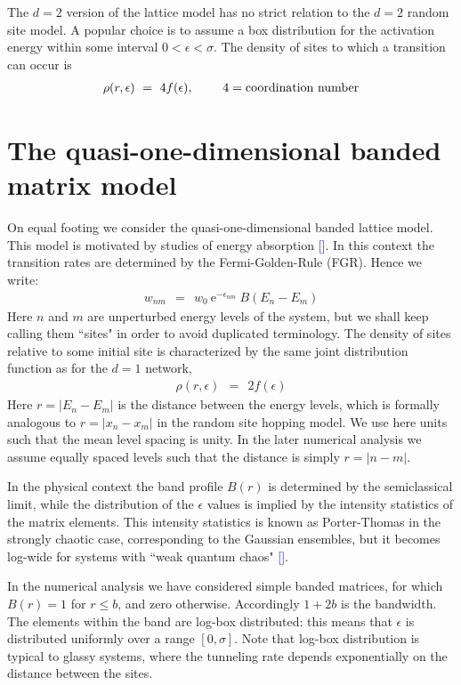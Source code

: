 \documentclass[aps,prb,floats,floatfix,twocolumn]{revtex4}
\newcommand{\eexp}{\mbox{e}^}
\newcommand{\mylabel}[1]{\label{#1}}
\newcommand{\beq}{\begin{eqnarray}}
\newcommand{\eeq}{\end{eqnarray}}
\newcommand{\be}[1]{\begin{eqnarray}\ifthenelse{#1=-1}
{\nonumber}{\ifthenelse{#1=0}{}{\mylabel{e#1}}}}
\renewcommand{\cite}[1]{\textcolor{blue}{[\onlinecite{#1}}]} %
\begin{document}
 
The $d{=}2$ version of the lattice model has no 
strict relation to the $d{=}2$ random site model. 
A popular choice is to assume a box distribution
for the activation energy within 
some interval ${0<\epsilon<\sigma}$. 
The density of sites to which a transition can occur is
%
\be{17}
\rho(r,\epsilon) \ = \ 4f(\epsilon), 
\ \ \ \ \ \ \ 4=\text{coordination number} 
\eeq 



\section{The quasi-one-dimensional banded matrix model}

\label{aBanded}

On equal footing we consider the quasi-one-dimensional banded lattice model.
This model is motivated by studies of energy absorption \cite{slk}.
In this context the transition rates are determined 
by the Fermi-Golden-Rule (FGR). Hence we write:
%
\beq
w_{nm} \ \ = \ \ w_0 \ \eexp{-\epsilon_{nm}} \ B\left(E_n-E_m\right)
\eeq
% 
Here $n$ and $m$ are unperturbed energy levels of the system, 
but we shall keep calling them ``sites" in order to avoid 
duplicated terminology.
The density of sites relative to some initial site 
is characterized by the same joint distribution function
as for the $d{=}1$ network,  
%
\beq
\rho(r,\epsilon) \ \ = \ \ 2f(\epsilon) 
\eeq 
%
Here $r=|E_n-E_m|$ is the distance between the energy levels, 
which is formally analogous to $r=|x_n-x_m|$ in the random site hopping model.
We use here units such that the mean level spacing is unity.
In the later numerical analysis we assume equally spaced levels 
such that the distance is simply ${r=|n-m|}$. 

In the physical context the band profile $B(r)$ is determined 
by the semiclassical limit, while the distribution of the $\epsilon$ 
values is implied by the intensity statistics of the matrix elements.
This intensity statistics is known as Porter-Thomas in the strongly 
chaotic case, corresponding to the Gaussian ensembles, 
but it becomes log-wide for systems with ``weak quantum chaos" \cite{SparseMat,kbw}. 

In the numerical analysis we have considered simple 
banded matrices, for which $B(r)=1$ for ${r \leq b}$, 
and zero otherwise. Accordingly $1{+}2b$ is the bandwidth.
The elements within the band are log-box distributed:
this means that $\epsilon$ is distributed uniformly over a range $[0,\sigma]$.  
Note that log-box distribution is typical to glassy systems, 
where the tunneling rate depends exponentially on the distance  
between the sites.
\end{document}
